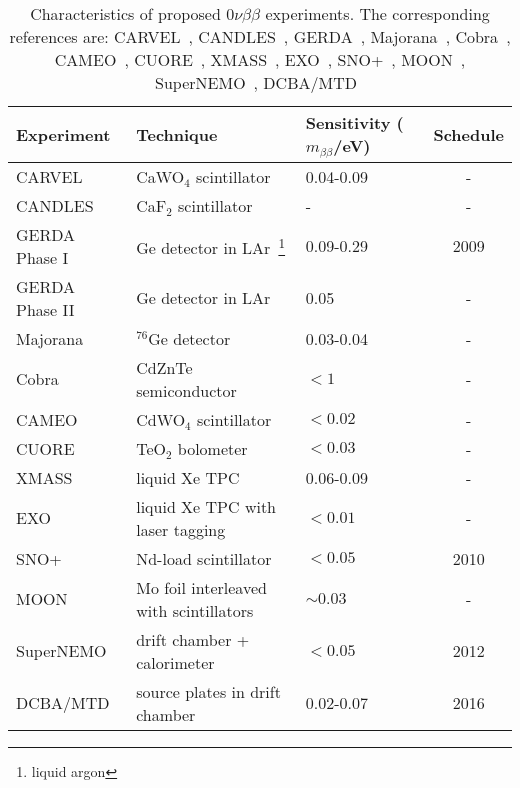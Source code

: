 \begin{table}[htbp]
  \centering
  \caption{Characteristics of proposed $0\nu\beta\beta$ experiments.                         The corresponding references are: CARVEL~\cite{Zde05},     CANDLES~\cite{Hir08}, GERDA~\cite{Sch05,Cal06}, Majorana~\cite{Aal04},     Cobra~\cite{Kie03}, CAMEO~\cite{Bel01}, CUORE~\cite{Ard05},     XMASS~\cite{Nak02}, EXO~\cite{Dani00}, SNO+~\cite{Zub07},             MOON~\cite{Nak06}, SuperNEMO~\cite{Sne08}, DCBA/MTD~\cite{Ish07}}
  \label{tab:gerda:comp}
  \begin{minipage}{\linewidth}
    \begin{tabular}{lllc} \hline Experiment & Technique & Sensitivity       ($m_{\beta\beta}$/eV) & Schedule \\\hline
      CARVEL & CaWO$_{4}$  scintillator & 0.04-0.09 & - \\
      CANDLES & CaF$_{2}$ scintillator & - & - \\
      GERDA Phase I & Ge detector in LAr~\footnote{liquid argon} &       0.09-0.29 & 2009 \\
      GERDA Phase II & Ge detector in LAr & 0.05 & - \\
      Majorana & $^{76}$Ge detector & 0.03-0.04 & - \\
      Cobra & CdZnTe semiconductor & $< 1$ & - \\
      CAMEO & CdWO$_{4}$ scintillator & $< 0.02$ & - \\
      CUORE & TeO$_{2}$ bolometer & $< 0.03$ & - \\
      XMASS & liquid Xe TPC & 0.06-0.09 & - \\
      EXO & liquid Xe TPC with laser tagging & $< 0.01$ & - \\
      SNO+ & Nd-load scintillator & $< 0.05$ & 2010 \\ 
      MOON & Mo foil interleaved with scintillators & $\sim0.03$ & -\\
      SuperNEMO & drift chamber + calorimeter & $< 0.05$ & 2012 \\
      DCBA/MTD & source plates in drift chamber & 0.02-0.07 & 2016 \\
    \end{tabular}
  \end{minipage}
\end{table}

